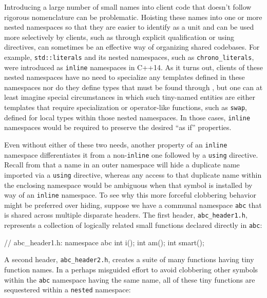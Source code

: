 Introducing a large number of small names into client code that doesn't
follow rigorous nomenclature can be problematic. Hoisting these names
into one or more nested namespaces so that they are easier to identify
as a unit and can be used more selectively by clients, such as through
explicit qualification or using directives, can sometimes be an
effective way of organizing shared codebases. For example,
\lstinline!std::literals! and its nested namespaces, such as
\lstinline!chrono_literals!, were introduced as \lstinline!inline! namespaces
in C++14. As it turns out, clients of these nested namespaces have no
need to specialize any templates defined in these namespaces nor do they
define types that must be found through , but one can at
least imagine special circumstances in which such tiny-named entities
are either templates that require specialization or operator-like
functions, such as \lstinline!swap!, defined for local types within those
nested namespaces. In those cases, \lstinline!inline! namespaces would be
required to preserve the desired ``as if'' properties.

Even without either of these two needs, another property of an
\lstinline!inline! namespace differentiates it from a non-\lstinline!inline!
one followed by a \lstinline!using! directive. Recall from
that a name in an outer namespace will
hide a duplicate name imported via a \lstinline!using! directive, whereas
any access to that duplicate name within the enclosing namespace would
be ambiguous when that symbol is installed by way of an \lstinline!inline!
namespace. To see why this more forceful clobbering behavior might be
preferred over hiding, suppose we have a communal namespace \lstinline!abc!
that is shared across multiple disparate headers. The first header,
\lstinline!abc_header1.h!, represents a collection of logically related
small functions declared directly in \lstinline!abc!:

\begin{emcppslisting}[emcppsbatch=e6]
// abc_header1.h:
namespace abc
{
    int i();
    int am();
    int smart();
}
\end{emcppslisting}

\noindent A second header, \lstinline!abc_header2.h!, creates a suite of many
functions having tiny function names. In a perhaps misguided effort to
avoid clobbering other symbols within the \lstinline!abc! namespace having
the same name, all of these tiny functions are sequestered within a
\lstinline!nested! namespace:

